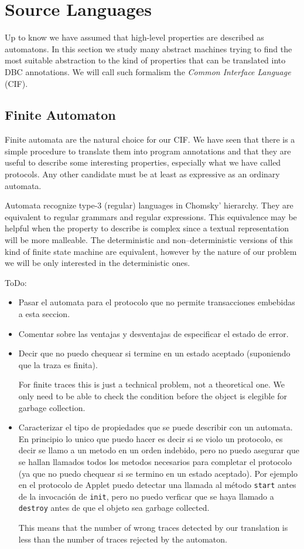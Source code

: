 \documentclass[a4paper,10pt]{article}
\begin{document}
\section{Source Languages}\label{sec:Source}
Up to know we have assumed that high-level properties are described as
automatons. In this section we study many abstract machines trying to
find the most suitable abstraction to the kind of properties that can be
translated into DBC annotations. We will call such formalism the \textit{Common
Interface Language} (CIF).


\subsection{Finite Automaton}
Finite automata are the natural choice for our CIF. We have seen that there is a
simple procedure to translate them into program annotations and that they are
useful to describe some interesting properties, especially what we have called
protocols. Any other candidate must be at least as expressive as an ordinary
automata.

Automata recognize type-3 (regular) languages in Chomsky' hierarchy. They are
equivalent to regular grammars and regular expressions. This equivalence may be
helpful when the property to describe is complex since a textual
representation will be more malleable. 
The deterministic and non--deterministic versions of this kind of finite state
machine are equivalent, however by the nature of our problem we will be only 
interested in the deterministic ones.

ToDo:
\begin{itemize}
  \item Pasar el automata para el protocolo que no permite transacciones
embebidas a esta seccion.
  \item Comentar sobre las ventajas y desventajas de especificar el estado de
error.
  \item Decir que no puedo chequear si termine en un estado aceptado (suponiendo
que la traza es finita).

For finite traces this is just a technical problem, not a theoretical one. We
only need to be able to check the condition before the object is elegible for
garbage collection.
  \item Caracterizar el tipo de propiedades que se puede describir con un
automata. En principio lo unico que puedo hacer es decir si se violo un
protocolo, es decir se llamo a un metodo en un orden indebido, pero no puedo
asegurar que se hallan llamados todos los metodos necesarios para completar el
protocolo (ya que no puedo chequear si se termino en un estado aceptado). Por
ejemplo en el protocolo de Applet puedo detectar una llamada al m\'etodo
\texttt{start} antes de la invocaci\'on de \texttt{init}, pero no puedo
verficar que se haya llamado a \texttt{destroy} antes de que el objeto sea
garbage collected.

  This means that the number of wrong traces detected by our translation is
less than the number of traces rejected by the automaton.
\end{itemize}
\end{document}
